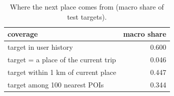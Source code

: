 \begin{table}[t]
\centering\small
\caption{Where the next place comes from (macro share of test targets).}
\label{tab:A4_coverage}
\begin{tabular}{lr}
\toprule
coverage & macro share \\
\midrule
target in user history & 0.600 \\
target = a place of the current trip & 0.046 \\
target within 1 km of current place & 0.447 \\
target among 100 nearest POIs & 0.344 \\
\bottomrule
\end{tabular}
\end{table}
